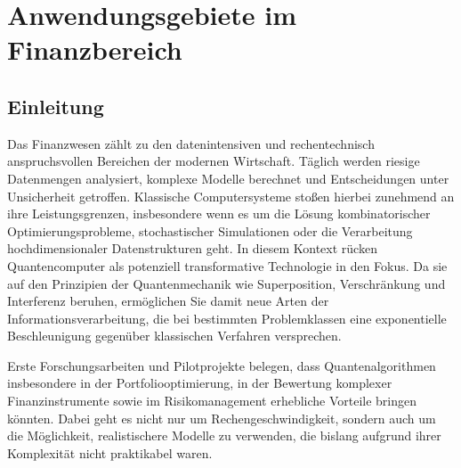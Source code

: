 \chapter{Anwendungsgebiete im Finanzbereich}
\label{trends} %





\section{Einleitung}
Das Finanzwesen zählt zu den datenintensiven und rechentechnisch anspruchsvollen Bereichen der modernen Wirtschaft. Täglich werden riesige Datenmengen analysiert, komplexe Modelle berechnet und Entscheidungen unter Unsicherheit getroffen. Klassische Computersysteme stoßen hierbei zunehmend an ihre Leistungsgrenzen, insbesondere wenn es um die Lösung kombinatorischer Optimierungsprobleme, stochastischer Simulationen oder die Verarbeitung hochdimensionaler Datenstrukturen geht. In diesem Kontext rücken Quantencomputer als potenziell transformative Technologie in den Fokus. Da sie auf den Prinzipien der Quantenmechanik wie Superposition, Verschränkung und Interferenz beruhen, ermöglichen Sie damit neue Arten der Informationsverarbeitung, die bei bestimmten Problemklassen eine exponentielle Beschleunigung gegenüber klassischen Verfahren versprechen.

Erste Forschungsarbeiten und Pilotprojekte belegen, dass Quantenalgorithmen insbesondere in der Portfoliooptimierung, in der Bewertung komplexer Finanzinstrumente sowie im Risikomanagement erhebliche Vorteile bringen könnten. Dabei geht es nicht nur um Rechengeschwindigkeit, sondern auch um die Möglichkeit, realistischere Modelle zu verwenden, die bislang aufgrund ihrer Komplexität nicht praktikabel waren. 

